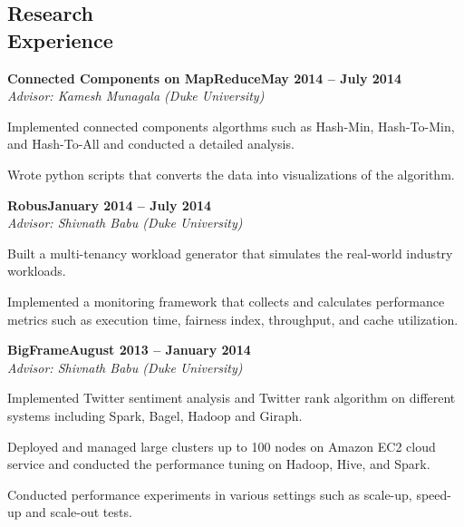 \documentclass[11pt,margin,line]{cv}
\begin{document}
\begin{resume}
    \section{\mysidestyle Research\\Experience}
    \textbf{Connected Components on MapReduce}\hfill \textbf{May 2014 -- July 2014} \vspace{1mm}\\\vspace{0mm}%
    \textsl{Advisor: Kamesh Munagala (Duke University)}
    \vspace{-2mm}\\\vspace{-1mm}%
    \begin{list3}
        \item Implemented connected components algorthms such as Hash-Min, Hash-To-Min, and Hash-To-All and conducted a detailed analysis.
        \item Wrote python scripts that converts the data into visualizations of the algorithm.
    \end{list3}
    \textbf{Robus}\hfill \textbf{January 2014 -- July 2014} \vspace{1mm}\\\vspace{0mm}%
    \textsl{Advisor: Shivnath Babu (Duke University)}
    \vspace{-2mm}\\\vspace{-1mm}%
    \begin{list3}
        \item Built a multi-tenancy workload generator that simulates the real-world industry workloads.
        \item Implemented a monitoring framework that collects and calculates performance metrics such as execution time, fairness index, throughput, and cache utilization.
    \end{list3}
    \textbf{BigFrame}\hfill \textbf{August 2013 -- January 2014} \vspace{1mm}\\\vspace{0mm}%
    \textsl{Advisor: Shivnath Babu (Duke University)}
    \vspace{-2mm}\\\vspace{-1mm}%
    \begin{list3}
      \item Implemented Twitter sentiment analysis and Twitter rank algorithm on different systems including Spark, Bagel, Hadoop and Giraph.
      \item Deployed and managed large clusters up to 100 nodes on Amazon EC2 cloud service and conducted the performance tuning on Hadoop, Hive, and Spark.
      \item Conducted performance experiments in various settings such as scale-up, speed-up and scale-out tests.
    \end{list3}

\end{resume}
\end{document}
